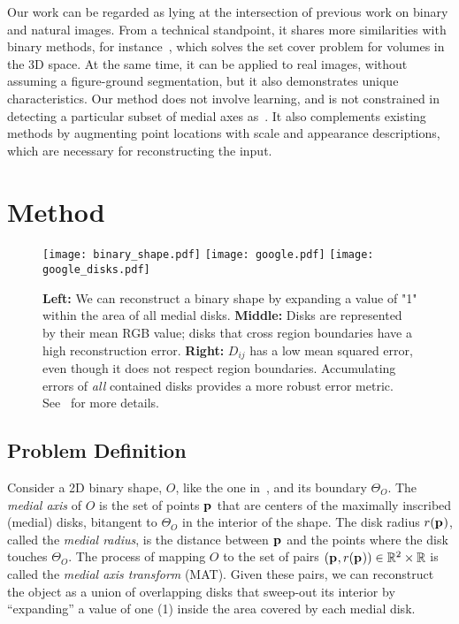 \documentclass[10pt,twocolumn,letterpaper]{article}
\begin{document}
Our work can be regarded as lying at the intersection of previous work on binary and natural images.
From a technical standpoint, it shares more similarities with binary methods, for instance~\cite{stolpner2012medial},
which solves the set cover problem for volumes in the 3D space.
At the same time, it can be applied to real images, without assuming a figure-ground segmentation,
but it also demonstrates unique characteristics.
Our method does not involve learning, and is not constrained in detecting a particular subset of
medial axes as~\cite{tsogkas2012learning,shen2016object}.
It also complements existing methods by augmenting point locations with scale and appearance descriptions, which
are necessary for reconstructing the input.


\section{Method}\label{sec:method}

\begin{figure*}[t]
\centering
\texttt{[image: binary\_shape.pdf]}\hfill
\texttt{[image: google.pdf]}\hfill
\texttt{[image: google\_disks.pdf]}
\caption{\textbf{Left:} We can reconstruct a binary shape by expanding a value of "1" within the area of all medial disks.
\textbf{Middle:} Disks are represented by their mean RGB value; disks that cross region boundaries have a high reconstruction error.
\textbf{Right:} $D_{ij}$ has a low mean squared error, even though it does not respect region boundaries.
Accumulating errors of \emph{all} contained disks provides a more robust error metric. See~ for more details.}
\label{fig:method:definition}
\end{figure*}

\subsection{Problem Definition}\label{sec:method:definition}
Consider a 2D binary shape, $O$, like the one in~, and its boundary $\Theta_O$.
The \emph{medial axis} of $O$ is the set of points $\mathbf{p}_{}$ that
are centers of the maximally inscribed (medial) disks, bitangent to $\Theta_O$
in the interior of the shape. The disk radius $r(\mathbf{p}_{})$, called the \emph{medial radius}, 
is the distance between $\mathbf{p}_{}$ and the points where the disk touches $\Theta_O$.
The process of mapping $O$ to the set of pairs $(\mathbf{p}_{},r(\mathbf{p}_{})) \in \mathbb{R}^2 \times \mathbb{R}$
is called the \emph{medial axis transform} (MAT).
Given these pairs, we can reconstruct the object as a union of overlapping disks that sweep-out 
its interior by ``expanding'' a value of one (1) inside the area covered by each  medial disk.
\end{document}
